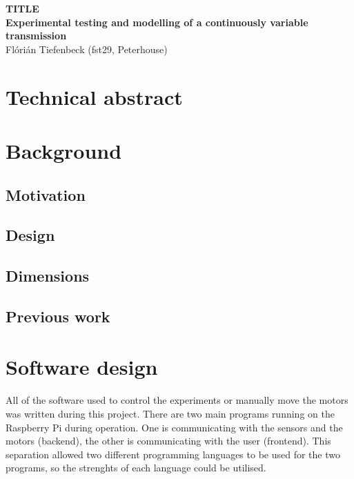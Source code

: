 \documentclass[12pt]{article}
\author{Flórián Tiefenbeck (fst29)}
\date{Michaelmas, 2022}
\begin{document}
\begin{center}
{\Huge \bf TITLE}\\
\vspace{6pt}
{\LARGE \bf Experimental testing and modelling of a continuously variable transmission}\\
\vspace{4pt}
{\LARGE Flórián Tiefenbeck (fst29, Peterhouse)}\\
\end{center}

\section{Technical abstract}

\section{Background}

\subsection{Motivation}

\subsection{Design}

\subsection{Dimensions}

\subsection{Previous work}



\section{Software design}
All of the software used to control the experiments or manually move the motors was written during this project. There are two main programs running on the Raspberry Pi during operation. One is communicating with the sensors and the motors (backend), the other is communicating with the user (frontend). This separation allowed two different programming languages to be used for the two programs, so the strenghts of each language could be utilised.
\end{document}
